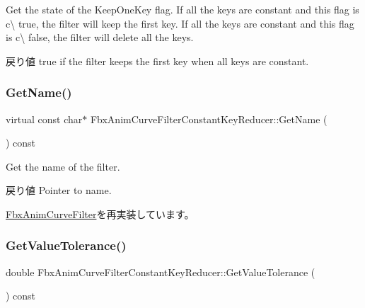 Get the state of the Keep\+One\+Key flag. If all the keys are constant and this flag is c\textbackslash{} true, the filter will keep the first key. If all the keys are constant and this flag is c\textbackslash{} false, the filter will delete all the keys. \begin{DoxyReturn}{戻り値}
{\ttfamily true} if the filter keeps the first key when all keys are constant. 
\end{DoxyReturn}
\mbox{\label{class_fbx_anim_curve_filter_constant_key_reducer_a1f856490df5d301d1c1e202958a3240c}} 
\subsubsection{\texorpdfstring{Get\+Name()}{GetName()}}
{\footnotesize\ttfamily virtual const char$\ast$ Fbx\+Anim\+Curve\+Filter\+Constant\+Key\+Reducer\+::\+Get\+Name (\begin{DoxyParamCaption}{ }\end{DoxyParamCaption}) const\hspace{0.3cm}{\ttfamily [virtual]}}

Get the name of the filter. \begin{DoxyReturn}{戻り値}
Pointer to name. 
\end{DoxyReturn}


\hyperlink{class_fbx_anim_curve_filter_abd559d5052fbb072042e59241940a35c}{Fbx\+Anim\+Curve\+Filter}を再実装しています。

\mbox{\label{class_fbx_anim_curve_filter_constant_key_reducer_a0ff1db2f653a0217e0560550be3d947f}} 
\subsubsection{\texorpdfstring{Get\+Value\+Tolerance()}{GetValueTolerance()}}
{\footnotesize\ttfamily double Fbx\+Anim\+Curve\+Filter\+Constant\+Key\+Reducer\+::\+Get\+Value\+Tolerance (\begin{DoxyParamCaption}{ }\end{DoxyParamCaption}) const}

